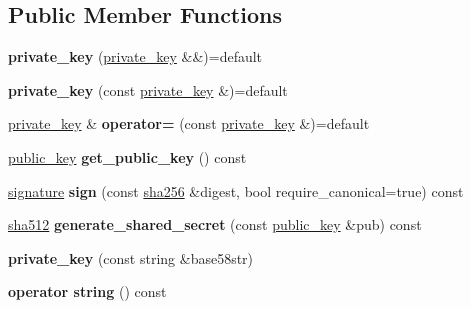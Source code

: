 \subsection*{Public Member Functions}
\begin{DoxyCompactItemize}
\item 
\mbox{\label{classfc_1_1crypto_1_1private__key_aa66b4452b84df8fec3256102dcee3014}} 
{\bfseries private\+\_\+key} (\mbox{\hyperlink{classfc_1_1crypto_1_1private__key}{private\+\_\+key}} \&\&)=default
\item 
\mbox{\label{classfc_1_1crypto_1_1private__key_a95079e469c74f479d3e6d6d566630d75}} 
{\bfseries private\+\_\+key} (const \mbox{\hyperlink{classfc_1_1crypto_1_1private__key}{private\+\_\+key}} \&)=default
\item 
\mbox{\label{classfc_1_1crypto_1_1private__key_a76a2cb8c3522dcb5a5d2e638a7e59b3c}} 
\mbox{\hyperlink{classfc_1_1crypto_1_1private__key}{private\+\_\+key}} \& {\bfseries operator=} (const \mbox{\hyperlink{classfc_1_1crypto_1_1private__key}{private\+\_\+key}} \&)=default
\item 
\mbox{\label{classfc_1_1crypto_1_1private__key_a5beb3f9004f8fe3e4d5bfe7256e55bdd}} 
\mbox{\hyperlink{classfc_1_1crypto_1_1public__key}{public\+\_\+key}} {\bfseries get\+\_\+public\+\_\+key} () const
\item 
\mbox{\label{classfc_1_1crypto_1_1private__key_a6a4dcc3847d7c1e6163cd9cf8d848859}} 
\mbox{\hyperlink{classfc_1_1crypto_1_1signature}{signature}} {\bfseries sign} (const \mbox{\hyperlink{classfc_1_1sha256}{sha256}} \&digest, bool require\+\_\+canonical=true) const
\item 
\mbox{\label{classfc_1_1crypto_1_1private__key_a8b159cca225424adbc4eea29cc6fae6b}} 
\mbox{\hyperlink{classfc_1_1sha512}{sha512}} {\bfseries generate\+\_\+shared\+\_\+secret} (const \mbox{\hyperlink{classfc_1_1crypto_1_1public__key}{public\+\_\+key}} \&pub) const
\item 
\mbox{\label{classfc_1_1crypto_1_1private__key_af5798dd78f482c612293880fc19750aa}} 
{\bfseries private\+\_\+key} (const string \&base58str)
\item 
\mbox{\label{classfc_1_1crypto_1_1private__key_a34cf091c054236d65ff3f454403f801f}} 
{\bfseries operator string} () const
\end{DoxyCompactItemize}
